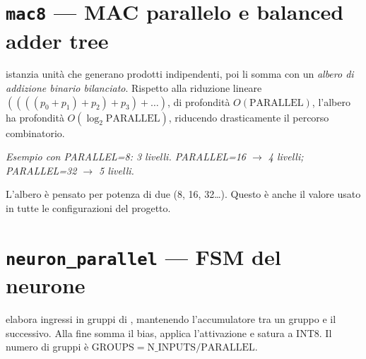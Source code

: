 \section{\texttt{mac8} --- MAC parallelo e balanced adder tree}
 istanzia  unità  che generano
 prodotti indipendenti, poi li somma con un \emph{albero di addizione
binario bilanciato}. Rispetto alla riduzione lineare
$((((p_0{+}p_1){+}p_2){+}p_3){+}\dots)$, di profondità $O(\text{PARALLEL})$, l'albero
ha profondità $O(\log_2 \text{PARALLEL})$, riducendo drasticamente il percorso
combinatorio.

\begin{center}
\end{center}
\begin{center}\footnotesize\itshape\color{fnGrey}
Esempio con PARALLEL=8: 3 livelli. PARALLEL=16 $\to$ 4 livelli; PARALLEL=32 $\to$ 5
livelli.\end{center}

\begin{fnnote}
L'albero è pensato per  potenza di due (8, 16, 32\ldots). Questo è anche
il valore usato in tutte le configurazioni del progetto.
\end{fnnote}

\section{\texttt{neuron\_parallel} --- FSM del neurone}
 elabora  ingressi in gruppi di ,
mantenendo l'accumulatore tra un gruppo e il successivo. Alla fine somma il bias,
applica l'attivazione e satura a INT8. Il numero di gruppi è
$\text{GROUPS}=\text{N\_INPUTS}/\text{PARALLEL}$.

